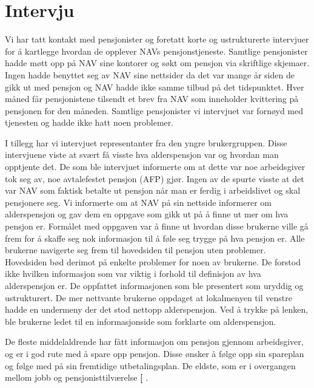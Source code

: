 \documentclass[informationsecurity]{gucmasterproject}
\begin{document}
\section{Intervju}
Vi har tatt kontakt med pensjonister og foretatt korte og ustrukturerte intervjuer for å kartlegge hvordan de opplever NAVs pensjonstjeneste. Samtlige pensjonister hadde møtt opp på NAV sine kontorer og søkt om pensjon via skriftlige skjemaer. Ingen hadde benyttet seg av NAV sine nettsider da det var mange år siden de gikk ut med pensjon og NAV hadde ikke samme tilbud på det tidspunktet. Hver måned får pensjonistene tilsendt et brev fra NAV som inneholder kvittering på pensjonen for den måneden. Samtlige pensjonister vi intervjuet var fornøyd med tjenesten og hadde ikke hatt noen problemer.

I tillegg har vi intervjuet representanter fra den yngre brukergruppen. Disse intervjuene viste at svært få visste hva alderspensjon var og hvordan man opptjente det. De som ble intervjuet informerte om at dette var noe arbeidsgiver tok seg av, noe avtalefestet pensjon (AFP) gjør. Ingen av de spurte visste at det var NAV som faktisk betalte ut pensjon når man er ferdig i arbeidslivet og skal pensjonere seg. Vi informerte om at NAV på sin nettside informerer om alderspensjon og gav dem en oppgave som gikk ut på å finne ut mer om hva pensjon er. Formålet med oppgaven var å finne ut hvordan disse brukerne ville gå frem for å skaffe seg nok informasjon til å føle seg trygge på hva pensjon er.
Alle brukerne navigerte seg frem til hovedsiden til pensjon uten problemer. Hovedsiden bød derimot på enkelte problemer for noen av brukerne. De forstod ikke hvilken informasjon som var viktig i forhold til definisjon av hva alderspensjon er. De oppfattet informasjonen som ble presentert som uryddig og ustrukturert. De mer nettvante brukerne oppdaget at lokalmenyen til venstre hadde en undermeny der det stod nettopp alderspensjon. Ved å trykke på lenken, ble brukerne ledet til en informasjonside som forklarte om alderspensjon.

De fleste middelaldrende har fått informasjon om pensjon gjennom arbeidsgiver, og er i god rute med å spare opp pensjon. Disse ønsker å følge opp sin spareplan og følge med på sin fremtidige utbetalingsplan. De eldste, som er i overgangen mellom jobb og pensjonisttilværelse \textbf{[ }.
\end{document}
